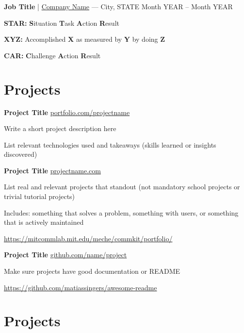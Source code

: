 \documentclass[letterpaper,11pt]{article}
\newcommand*{\Job}[6]{
  \textbf{#2} | \href{#5}{#3} --- {\small #4} \hfill {\small #1} \\
  \vspace{-9pt}
  \begin{itemize}
    {#6}
  \end{itemize}
}
\newcommand*{\Project}[4]{
  \textbf{#1} \hfill \href{#3}{\small #2} \\
  \vspace{-9pt}
  \begin{itemize}
    {#4}
  \end{itemize}
}
\begin{document}
\Job
  {Month YEAR -- Month YEAR}
  {Job Title}
  {Company Name}
  {City, STATE}
  {https://company-website.com}
  {
    \item \textbf{STAR:} \textbf{S}ituation \textbf{T}ask \textbf{A}ction \textbf{R}esult
    \item \textbf{XYZ:} Accomplished \textbf{X} as measured by \textbf{Y} by doing \textbf{Z}
    \item \textbf{CAR:} \textbf{C}hallenge \textbf{A}ction \textbf{R}esult
  }

\vspace{-18.5pt}


\section*{Projects}
 
\Project 
  {Project Title}                   %
  {portfolio.com/projectname}       %
  {https://kennyzqng.com}           %
  {                                 %
    \item Write a short project description here
    \item List relevant technologies used and takeaways 
      (skills learned or insights discovered)
  } 

\Project 
  {Project Title}
  {projectname.com}
  {https://mitcommlab.mit.edu/meche/commkit/portfolio/}
  {
    \item List real and relevant projects that standout
      (not mandatory school projects or trivial tutorial projects)
    \item Includes: something that solves a problem, something with users,
      or something that is actively maintained
    \item \url{https://mitcommlab.mit.edu/meche/commkit/portfolio/}
  }

\Project 
  {Project Title}
  {github.com/name/project}
  {https://github.com/matiassingers/awesome-readme}
  {
    \item Make sure projects have good documentation or README
    \item \url{https://github.com/matiassingers/awesome-readme}
  }

\section*{Projects}
\end{document}
